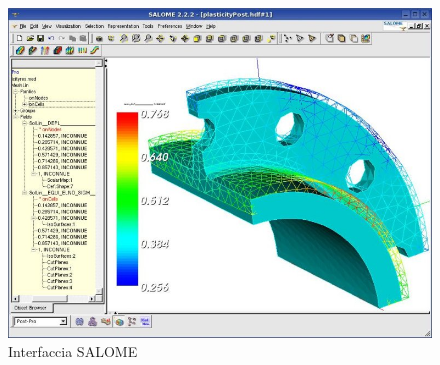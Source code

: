         \begin{figure}[H]
            \centering
            \includegraphics[width=\linewidth]{figure/salome.jpg}
            \caption{Interfaccia SALOME}
        \end{figure}
